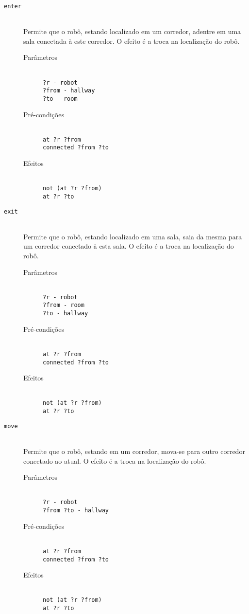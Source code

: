 \documentclass[letterpaper]{article}
\begin{document}
\begin{description}
\item[\texttt{enter}] \hfill\\ 
  Permite que o robô, estando localizado em um corredor, adentre em uma sala conectada à este corredor. O efeito é a 
  troca na localização do robô.
    \begin{description}
      \item[Parâmetros] \hfill\\
        \texttt{?r - robot\\?from - hallway\\?to - room}
      \item[Pré-condições] \hfill\\
        \texttt{at ?r ?from\\connected ?from ?to}
      \item[Efeitos] \hfill\\
        \texttt{not (at ?r ?from)\\at ?r ?to}
    \end{description}

\item[\texttt{exit}] \hfill\\
  Permite que o robô, estando localizado em uma sala, saia da mesma para um corredor conectado à esta sala. O efeito é 
  a troca na localização do robô.
    \begin{description}
      \item[Parâmetros] \hfill\\
        \texttt{?r - robot\\?from - room\\?to - hallway}
      \item[Pré-condições] \hfill\\
        \texttt{at ?r ?from\\connected ?from ?to}
      \item[Efeitos] \hfill\\
        \texttt{not (at ?r ?from)\\at ?r ?to}
    \end{description}

\item[\texttt{move}] \hfill\\
  Permite que o robô, estando em um corredor, mova-se para outro corredor conectado ao atual. O efeito é a troca na 
  localização do robô.
    \begin{description}
      \item[Parâmetros] \hfill\\
        \texttt{?r - robot\\?from ?to - hallway}
      \item[Pré-condições] \hfill\\
        \texttt{at ?r ?from\\connected ?from ?to}
      \item[Efeitos] \hfill\\
        \texttt{not (at ?r ?from)\\at ?r ?to}
    \end{description}


\end{description}
\end{document}
